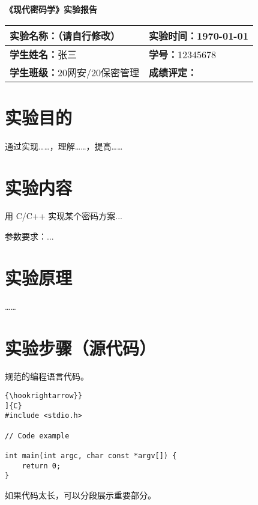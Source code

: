 \documentclass[fontsize=10.5pt]{ctexart}
\begin{document}
\begin{center}
    \textbf{\fontsize{14}{14}《现代密码学》实验报告}
\end{center}

\noindent
\begin{tabularx}{\textwidth}{|X|X|}
    \hline
    \textbf{实验名称：}（请自行修改）
    &
    \textbf{实验时间：}\today
    \\ \hline
    \textbf{学生姓名：}张三
    &
    \textbf{学号：}12345678
    \\ \hline
    \textbf{学生班级：}20网安/20保密管理
    &
    \textbf{成绩评定：}
    \\ \hline
\end{tabularx}

\section{实验目的}

通过实现……，理解……，提高……

\section{实验内容}

用 C/C++ 实现某个密码方案...

参数要求：...

\section{实验原理}

……

\section{实验步骤（源代码）}

规范的编程语言代码。

{
\linespread{1}
\renewcommand{\theFancyVerbLine}{\textcolor[HTML]{888888}{\arabic{FancyVerbLine}}}

\begin{verbatim}{\hookrightarrow}}
]{C}
#include <stdio.h>

// Code example

int main(int argc, char const *argv[]) {
    return 0;
}
\end{verbatim}
}

如果代码太长，可以分段展示重要部分。
\end{document}

